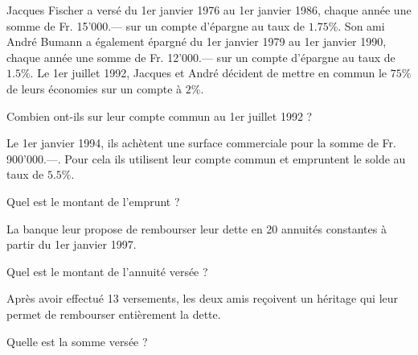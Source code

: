 \begin{exercice}
Jacques Fischer a versé du 1er janvier 1976 au 1er janvier 1986, chaque année une somme de Fr. 15'000.— sur un compte d’épargne au taux de $1.75 \%$.
Son ami André Bumann a également épargné du 1er janvier 1979 au 1er janvier 1990, chaque année une somme de Fr. 12'000.— sur un compte d’épargne au taux de $1.5 \%$.
Le 1er juillet 1992, Jacques et André décident de mettre en commun le $75 \%$ de leurs économies sur un compte à $2 \%$.

Combien ont-ils sur leur compte commun au 1er juillet 1992 ?

Le 1er janvier 1994, ils achètent une surface commerciale pour la somme de Fr. 900'000.—. Pour cela ils utilisent leur compte commun et empruntent le solde au taux de $5.5 \%$. 

Quel est le montant de l’emprunt ?

La banque leur propose de rembourser leur dette en 20 annuités constantes à partir du 1er janvier 1997.

Quel est le montant de l’annuité versée ?

Après avoir effectué 13 versements, les deux amis reçoivent un héritage qui leur permet de rembourser entièrement la dette. 

Quelle est la somme versée ?
\end{exercice}